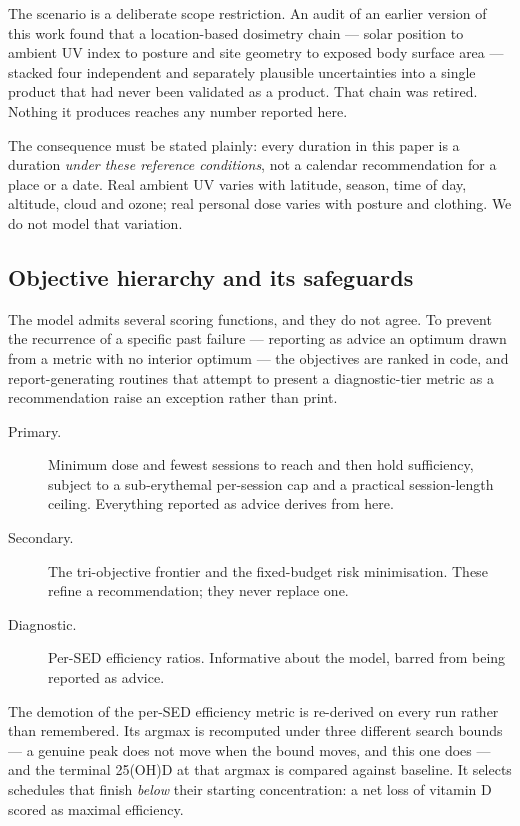 \documentclass[11pt]{article}
\newcommand{\SED}{SED}
\begin{document}
The scenario is a deliberate scope restriction. An audit of an earlier
version of this work found that a location-based dosimetry chain
--- solar position to ambient UV index to posture and site geometry to
exposed body surface area --- stacked four independent and separately
plausible uncertainties into a single product that had never been
validated as a product. That chain was retired. Nothing it produces
reaches any number reported here.

The consequence must be stated plainly: every duration in this paper
is a duration \emph{under these reference conditions}, not a calendar
recommendation for a place or a date. Real ambient UV varies with
latitude, season, time of day, altitude, cloud and ozone; real
personal dose varies with posture and clothing. We do not model that
variation.

\subsection{Objective hierarchy and its safeguards}
\label{sec:objectives}

The model admits several scoring functions, and they do not agree. To
prevent the recurrence of a specific past failure --- reporting as
advice an optimum drawn from a metric with no interior optimum --- the
objectives are ranked in code, and report-generating routines that
attempt to present a diagnostic-tier metric as a recommendation raise
an exception rather than print.

\begin{description}
\item[Primary.] Minimum dose and fewest sessions to reach and then
      hold sufficiency, subject to a sub-erythemal per-session cap and
      a practical session-length ceiling. Everything reported as
      advice derives from here.
\item[Secondary.] The tri-objective frontier and the fixed-budget risk
      minimisation. These refine a recommendation; they never replace
      one.
\item[Diagnostic.] Per-\SED{} efficiency ratios. Informative about the
      model, barred from being reported as advice.
\end{description}

The demotion of the per-\SED{} efficiency metric is re-derived on
every run rather than remembered. Its argmax is recomputed under three
different search bounds --- a genuine peak does not move when the
bound moves, and this one does --- and the terminal 25(OH)D at that
argmax is compared against baseline. It selects schedules that finish
\emph{below} their starting concentration: a net loss of vitamin D
scored as maximal efficiency.
\end{document}
